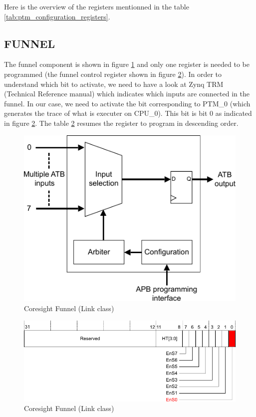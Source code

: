 \documentclass[10pt,a4paper, oneside]{memoir}
\begin{document}
Here is the overview of the registers mentionned in the table \ref{tab:ptm_configuration_registers}.

 
\subsection{FUNNEL}
The funnel component is shown in figure \ref{fig:funnel} and only one register is needed to be programmed (the funnel control register shown in figure \ref{fig:cs_funnel_control_register}). In order to understand which bit to activate, we need to have a look at Zynq TRM (Technical Reference manual) which indicates which inputs are connected in the funnel. In our case, we need to activate the bit corresponding to PTM\_0 (which generates the trace of what is executer on CPU\_0). This bit is bit 0 as indicated in figure \ref{fig:cs_funnel_control_register}. The table \ref{fig:cs_funnel_control_register} resumes the register to program in descending order.


\begin{figure}
\centering
\includegraphics[scale=1, keepaspectratio]{images/coresight/cs_trace_funnel}
\caption{Coresight Funnel (Link class)}
\label{fig:funnel}
\end{figure}


\begin{figure}
\centering
\includegraphics[scale=1, keepaspectratio]{images/coresight/cs_funnel_control_register}
\caption{Coresight Funnel (Link class)}
\label{fig:cs_funnel_control_register}
\end{figure}
\end{document}
